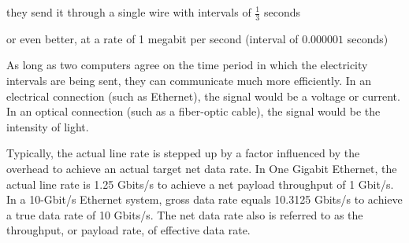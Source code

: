 \documentclass{article}
\begin{document}
    \begin{center}
    \end{center}

    they send it through a single wire with intervals of $\frac{1}{3}$ seconds

    \begin{center}
    \end{center}

    or even better, at a rate of 1 megabit per second (interval of $0.000001$ seconds)

    \begin{center}
    \end{center}

    As long as two computers agree on the time period in which the electricity intervals are being sent, they can communicate much more efficiently. In an electrical connection (such as Ethernet), the signal would be a voltage or current. In an optical connection (such as a fiber-optic cable), the signal would be the intensity of light. 

    Typically, the actual line rate is stepped up by a factor influenced by the overhead to achieve an actual target net data rate. In One Gigabit Ethernet, the actual line rate is 1.25 Gbits/s to achieve a net payload throughput of 1 Gbit/s. In a 10-Gbit/s Ethernet system, gross data rate equals 10.3125 Gbits/s to achieve a true data rate of 10 Gbits/s. The net data rate also is referred to as the throughput, or payload rate, of effective data rate.
\end{document}

